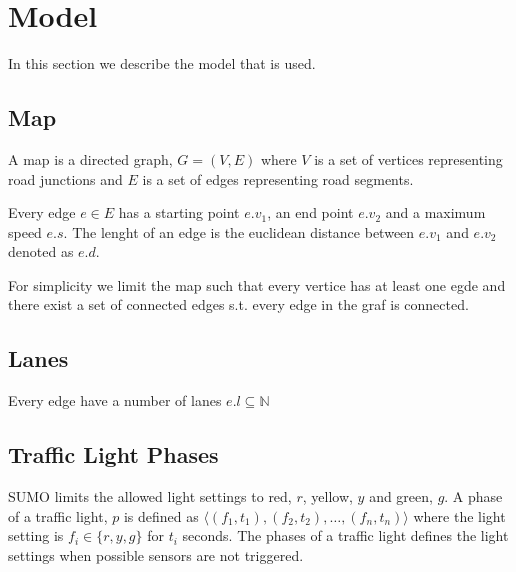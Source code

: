 \section{Model}
In this section we describe the model that is used.

\begin{comment}\\\\
\noindent\begin{tabular}{ll}
$\Sigma$ & alphabet\\
$\mathbb{R}$ & set of real numbers\\
$\mathbb{N}$ & set of natual numbers not including zero\\
$\mathbb{N}_0$ & set of natual numbers including zero
\end{tabular}
\end{comment}

\subsection{Map}
A map is a directed graph, $G = (V, E)$ where $V$ is a set of vertices representing road junctions and $E$ is a set of edges representing road segments.

Every edge $e\in E$ has a starting point $e.v_1$, an end point $e.v_2$ and a maximum speed $e.s$. The lenght of an edge is the euclidean distance between $e.v_1$ and $e.v_2$ denoted as $e.d$.

For simplicity we limit the map such that every vertice has at least one egde
and there exist a set of connected edges s.t. every edge in the graf is connected.%

\subsection{Lanes}
Every edge have a number of lanes $e.l \subseteq \mathbb{N} $


\subsection{Traffic Light Phases}
SUMO limits the allowed light settings to red, $r$, yellow, $y$ and green, $g$.
A phase of a traffic light, $p$ is defined as $\langle(f_1, t_1),(f_2, t_2),\dots, (f_n, t_n) \rangle$ where the light setting is $f_i\in \{r, y, g\}$ for $t_i$ seconds.
The phases of a traffic light defines the light settings when possible sensors are not triggered.

